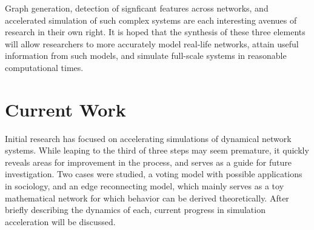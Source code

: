 \documentclass[11pt]{article}
\begin{document}
Graph generation, detection of signficant features across networks, and accelerated simulation of such complex systems are each interesting avenues of research in their own right. It is hoped that the synthesis of these three elements will allow researchers to more accurately model real-life networks, attain useful information from such models, and simulate full-scale systems in reasonable computational times.
\section{Current Work}
Initial research has focused on accelerating simulations of dynamical network systems. While leaping to the third of three steps may seem premature, it quickly reveals areas for improvement in the process, and serves as a guide for future investigation. Two cases were studied, a voting model with possible applications in sociology, and an edge reconnecting model, which mainly serves as a toy mathematical network for which behavior can be derived theoretically. After briefly describing the dynamics of each, current progress in simulation acceleration will be discussed.
\end{document}
